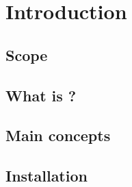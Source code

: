 \section{Introduction}

\subsection{Scope}


\subsection{What is \edps?}
\label{sec:what_is_edps}


\subsection{Main concepts}
\label{sec:main_concepts}


\subsection{Installation}
\label{sec:installation}


